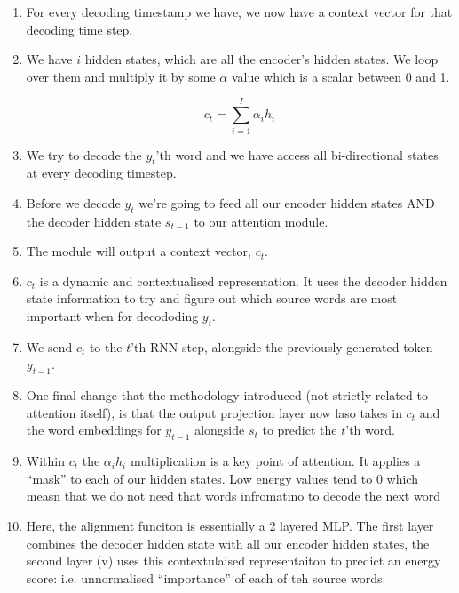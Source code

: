 \documentclass[11pt]{article}
\begin{document}
\begin{enumerate}
    \item For every decoding timestamp we have, we now have a context vector for that decoding time step.
    \item We have $i$ hidden states, which are all the encoder's hidden states. We loop over them and multiply it by some $\alpha$ value which is a scalar between 0 and 1.
    
    \begin{equation}
        c_t = \sum^I_{i=1}\alpha_ih_i
    \end{equation}

    \item We try to decode the $y_t$'th word and we have access all bi-directional states at every decoding timestep.
    \item Before we decode $y_t$ we're going to feed all our encoder hidden states AND the decoder hidden state $s_{t-1}$ to our attention module. 
    \item The module will output a context vector, $c_t$.
    \item $c_t$ is a dynamic and contextualised representation. It uses the decoder hidden state information to try and figure out which source words are most important when for decododing $y_t$. 
    \item We send $c_t$ to the $t$'th RNN step, alongside the previously generated token $y_{t-1}$. 
    \item One final change that the methodology introduced (not strictly related to attention itself), is that the output projection layer now laso takes in $c_t$ and the word embeddings for $y_{t-1}$ alongside $s_t$ to predict the $t$'th word.
    \item Within $c_t$ the $\alpha_i h_i$ multiplication is a key point of attention. It applies a ``mask'' to each of our hidden states. Low energy values tend to 0 which measn that we do not need that words infromatino to decode the next word
    \item Here, the alignment funciton is essentially a 2 layered MLP. The first layer combines the decoder hidden state with all our encoder hidden states, the second layer (v) uses this contextulaised representaiton to predict an energy score: i.e. unnormalised ``importance'' of each of teh source words.
\end{enumerate}
\end{document}
